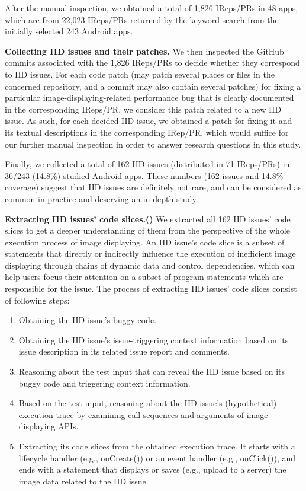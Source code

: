 After the manual inspection, we obtained a total of 1,826 IReps/PRs in 48 apps, which are from 22,023 IReps/PRs returned by the keyword search from the initially selected 243 Android apps.

\medskip

\noindent\textbf{Collecting IID issues and their patches.} 
We then inspected the GitHub commits associated with the 1,826 IReps/PRs to decide whether they correspond to IID issues.
For each code patch (may patch several places or files in the concerned repository, and a commit may also contain several patches) for fixing a particular image-displaying-related performance bug that is clearly documented in the corresponding IReps/PR, we consider this patch related to a new IID issue.
As such, for each decided IID issue, we obtained a patch for fixing it and its textual descriptions in the corresponding IRep/PR, which would suffice for our further manual inspection in order to answer research questions in this study.

Finally, we collected a total of 162 IID issues (distributed in 71 IReps/PRs) in 36/243 (14.8$\%$) studied Android apps. These numbers (162 issues and 14.8\% coverage) suggest that IID issues are definitely not rare, and can be considered as common in practice and deserving an in-depth study.

\medskip

\noindent\textbf{Extracting IID issues’ code slices.()} 
We extracted all 162 IID issues' code slices to get a deeper understanding of them from the perspective of the whole execution process of image displaying. An IID issue's code slice is a subset of statements that directly or indirectly influence the execution of inefficient image displaying through chains of dynamic data and control dependencies, which can help users focus their attention on a subset of program statements which are responsible for the issue. The process of extracting IID issues' code slices consist of following steps:

\begin{enumerate}
	\item Obtaining the IID issue’s buggy code.
	\item Obtaining the IID issue’s issue-triggering context information based on its issue description in its related issue report and comments.
	\item Reasoning about the test input that can reveal the IID issue based on its buggy code and triggering context information.
	\item Based on the test input, reasoning about the IID issue’s (hypothetical) execution trace by examining call sequences and arguments of image displaying APIs.
	\item Extracting its code slices from the obtained execution trace. It starts with a lifecycle handler (e.g., onCreate()) or an event handler (e.g., onClick()), and ends with a statement that displays or saves (e.g., upload to a server) the image data related to the IID issue.
\end{enumerate}

